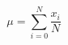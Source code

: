 \documentclass{article}
\begin{document}
\begin{huge}

\[\mu = \sum_{i=0}^{N} \frac{x_i}{N}\]

\end{huge}
\end{document}
